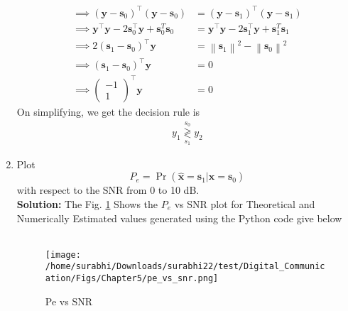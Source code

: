 \documentclass[journal,10pt,twocolumn]{IEEEtran}
\newcounter{Chapcounter}
\numberwithin{equation}{subsection}
\numberwithin{figure}{subsection}
\renewcommand\thesection{\theChapcounter.\arabic{section}}
\providecommand{\mbf}{\mathbf}
\providecommand{\pr}[1]{\ensuremath{\Pr\left(#1\right)}}
\providecommand{\brak}[1]{\ensuremath{\left(#1\right)}}
\providecommand{\norm}[1]{\left\lVert#1\right\rVert}
\newcommand{\solution}{\noindent \textbf{Solution: }}
\providecommand{\dec}[2]{\ensuremath{\overset{#1}{\underset{#2}{\gtrless}}}}
\newcommand{\myvec}[1]{\ensuremath{\begin{pmatrix}#1\end{pmatrix}}}
\let\vec\mathbf
\renewcommand\thesection{\arabic{section}}
\renewcommand\thesubsection{\thesection.\arabic{subsection}}
\begin{document}
\begin{enumerate}[label=\thesubsection.\arabic*,ref=\thesubsection.\arabic{figure}]
\begin{align}
	\implies \brak{\vec{y}-\vec{s}_0}^\top \brak{\vec{y}-\vec{s}_0} &= \brak{\vec{y}-\vec{s}_1}^\top \brak{\vec{y}-\vec{s}_1}\\
	\implies \vec{y}^\top\vec{y} - 2\vec{s}_0^\top \vec{y} + \vec{s}_0^T\vec{s}_0 &= \vec{y}^\top\vec{y} - 2\vec{s}_1^\top \vec{y} + \vec{s}_1^T\vec{s}_1\\
	\implies 2\brak{\vec{s}_1-\vec{s}_0}^\top \vec{y} &= \norm{\vec{s}_1}^2 - \norm{\vec{s}_0}^2\\
	\implies \brak{\vec{s}_1-\vec{s}_0}^\top \vec{y} &= 0\\
	\implies \myvec{-1\\1}^\top \vec{y} &= 0
\end{align}
        On simplifying, we get the decision rule is
        \begin{align}
        \label{eq:decision_rule}
        y_1 \dec{s_0}{s_1} y_2
        \end{align}
\item
Plot 
\begin{equation} 
P_e = \pr{\hat{\mbf{x}} = \mbf{s}_1|\mbf{x} = \mbf{s}_0}
\end{equation}
with respect to the SNR from 0 to 10 dB.\\
\solution 
The Fig. \ref{fig:Pe_snr2} Shows the $P_e$ vs SNR plot for Theoretical and Numerically Estimated values generated using the Python code give below\\

\\	

\begin{figure}[!ht]
\centering
\texttt{[image: /home/surabhi/Downloads/surabhi22/test/Digital\_Communication/Figs/Chapter5/pe\_vs\_snr.png]}     
\caption{Pe vs SNR }
\label{fig:Pe_snr2}
\end{figure}


\end{enumerate}
\end{document}
